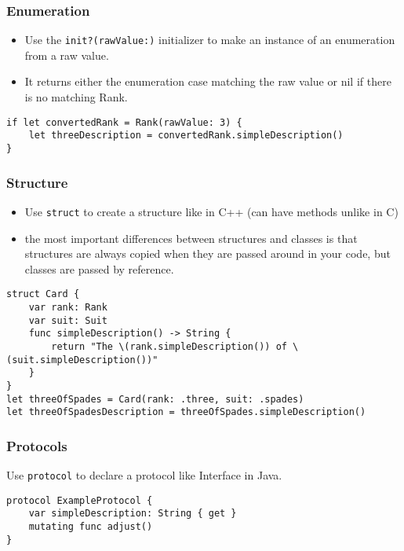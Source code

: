 \begin{frame}[fragile] \frametitle{Enumeration}

\begin{itemize}
\item Use the \lstinline|init?(rawValue:)| initializer to make an instance of an enumeration from a raw value. 
\item It returns either the enumeration case matching the raw value or nil if there is no matching Rank.
\end{itemize}

\begin{lstlisting}
if let convertedRank = Rank(rawValue: 3) {
    let threeDescription = convertedRank.simpleDescription()
}
\end{lstlisting}
\end{frame}

\begin{frame}[fragile] \frametitle{Structure}

\begin{itemize}
\item Use \lstinline|struct| to create a structure like in C++ (can have methods unlike in C)
\item the most important differences between structures and classes is that structures are always copied when they are passed around in your code, but classes are passed by reference.
\end{itemize}

\begin{lstlisting}
struct Card {
    var rank: Rank
    var suit: Suit
    func simpleDescription() -> String {
        return "The \(rank.simpleDescription()) of \(suit.simpleDescription())"
    }
}
let threeOfSpades = Card(rank: .three, suit: .spades)
let threeOfSpadesDescription = threeOfSpades.simpleDescription()
\end{lstlisting}
\end{frame}

\begin{frame}[fragile] \frametitle{Protocols}

Use \lstinline|protocol| to declare a protocol like Interface in Java.


\begin{lstlisting}
protocol ExampleProtocol {
    var simpleDescription: String { get }
    mutating func adjust()
}
\end{lstlisting}
\end{frame}

